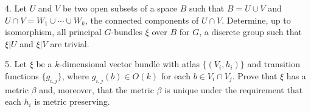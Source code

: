 4. Let $U$ and $V$ be two open subsets of a space $B$ such that $B = U \cup V$ and $U \cap V = W_1 \cup \cdots \cup W_k$, the connected components of $U \cap V$. Determine, up to isomorphism, all principal $G$-bundles $\xi$ over $B$ for $G$, a discrete group such that $\xi|U$ and $\xi|V$ are trivial.

5. Let $\xi$ be a $k$-dimensional vector bundle with atlas $\{(V_i, h_i)\}$ and transition functions $\{g_{i,j}\}$, where $g_{i,j}(b) \in O(k)$ for each $b \in V_i \cap V_j$. Prove that $\xi$ has a metric $\beta$ and, moreover, that the metric $\beta$ is unique under the requirement that each $h_i$ is metric preserving.
